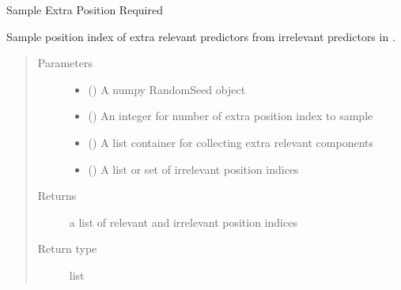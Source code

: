 \documentclass[letterpaper,10pt,english]{sphinxmanual}
\begin{document}

\begin{fulllineitems}
\label{\detokenize{Utilities:pysimrel.utilities.sample_extra_pos}}
Sample Extra Position Required

Sample position index of extra relevant predictors from irrelevant predictors in .
\begin{quote}\begin{description}
\item[{Parameters}] \leavevmode\begin{itemize}
\item {} 
 () \textendash{} A numpy RandomSeed object

\item {} 
 () \textendash{} An integer for number of extra position index to sample

\item {} 
 () \textendash{} A list container for collecting extra relevant components

\item {} 
 () \textendash{} A list or set of irrelevant position indices

\end{itemize}

\item[{Returns}] \leavevmode
a list of relevant and irrelevant position indices

\item[{Return type}] \leavevmode
list

\end{description}\end{quote}

\end{fulllineitems}
\end{document}
